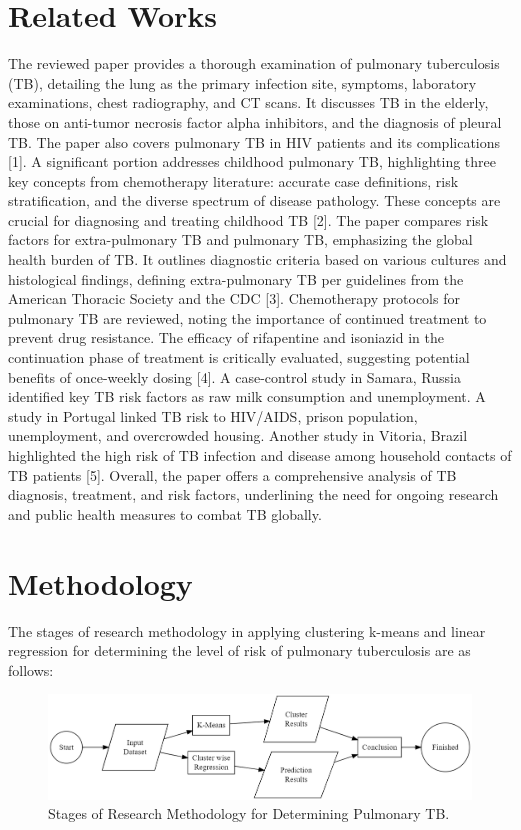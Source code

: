 \documentclass[conference]{IEEEtran}
\begin{document}
\section{Related Works}
The reviewed paper provides a thorough examination of pulmonary tuberculosis (TB), detailing the lung as the primary infection site, symptoms, laboratory examinations, chest radiography, and CT scans. It discusses TB in the elderly, those on anti-tumor necrosis factor alpha inhibitors, and the diagnosis of pleural TB. The paper also covers pulmonary TB in HIV patients and its complications [1]. A significant portion addresses childhood pulmonary TB, highlighting three key concepts from chemotherapy literature: accurate case definitions, risk stratification, and the diverse spectrum of disease pathology. These concepts are crucial for diagnosing and treating childhood TB [2]. The paper compares risk factors for extra-pulmonary TB and pulmonary TB, emphasizing the global health burden of TB. It outlines diagnostic criteria based on various cultures and histological findings, defining extra-pulmonary TB per guidelines from the American Thoracic Society and the CDC [3]. Chemotherapy protocols for pulmonary TB are reviewed, noting the importance of continued treatment to prevent drug resistance. The efficacy of rifapentine and isoniazid in the continuation phase of treatment is critically evaluated, suggesting potential benefits of once-weekly dosing [4]. A case-control study in Samara, Russia identified key TB risk factors as raw milk consumption and unemployment. A study in Portugal linked TB risk to HIV/AIDS, prison population, unemployment, and overcrowded housing. Another study in Vitoria, Brazil highlighted the high risk of TB infection and disease among household contacts of TB patients [5]. Overall, the paper offers a comprehensive analysis of TB diagnosis, treatment, and risk factors, underlining the need for ongoing research and public health measures to combat TB globally.

\section{Methodology}
The stages of research methodology in applying clustering k-means and linear regression for determining the level of risk of pulmonary tuberculosis are as follows: 

\begin{figure}[H]
    \centerline{\includegraphics[width=\linewidth]{fig2.png}}
    \caption{Stages of Research Methodology for Determining Pulmonary TB.}
    \label{fig2}
\end{figure}
\end{document}
